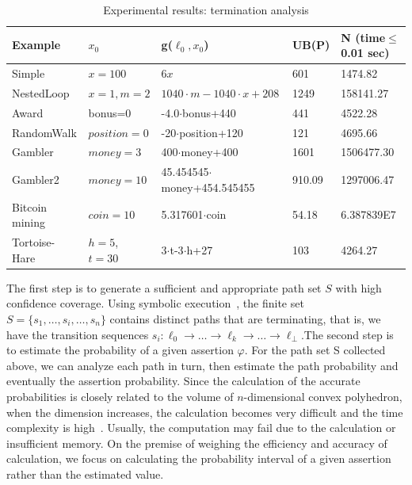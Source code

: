 \documentclass[sigconf,review, anonymous]{acmart}
\begin{document}
\begin{table}[htb]
	\caption{Experimental results: termination analysis}  
	\label{TerminationResult} 
	\begin{center}  
		\begin{tabular}{|l|l|l|l|l|}  
			\hline  	
			Example & $x_0$ & g($\ell_0,x_0$) & UB(P) & N (time$\leq$0.01 sec)\\ \hline  	
			Simple & $x=100$  & $6x$ & 601 & 1474.82 \\ \hline  		
			NestedLoop & $x=1, m=2$ & $1040\cdot m-1040\cdot x+208$ & 1249 & 158141.27 \\  \hline  
			Award & bonus=0 & -4.0$\cdot$bonus+440& 441 &4522.28 \\  \hline  
			RandomWalk & $position=0$ & -20$\cdot$position+120 & 121 & 4695.66 \\  \hline  
			Gambler& $money=3$ & 400$\cdot$money+400& 1601 & 1506477.30 \\ \hline  		 
			Gambler2 & $money=10$ & 45.454545$\cdot$money+454.545455 & 910.09 & 1297006.47 \\  \hline  
			Bitcoin mining & $coin=10$ & 5.317601$\cdot$coin & 54.18 & 6.387839E7 \\  \hline 
			Tortoise-Hare & $h=5$, $t=30$ & 3$\cdot$t-3$\cdot$h+27 & 103 & 4264.27 \\  \hline  
		\end{tabular}  
	\end{center}  
\end{table}

The first step is to generate a sufficient and appropriate path set $S$ with high confidence coverage. Using symbolic execution~\cite{Geldenhuys2012symbolic}, the finite set $S=\{s_1,\dots,s_i,\dots,s_n\}$ contains distinct paths that are terminating, that is, we have the transition sequences $s_i: \ell_0 \to \dots \to \ell_k \to \dots \to \ell_{\bot}$.The second step is to estimate the probability of a given assertion $\varphi$. For the path set S collected above, we can analyze each path in turn, then estimate the path probability and eventually the assertion probability. Since the calculation of the accurate probabilities is closely related to the volume of $n$-dimensional convex polyhedron, when the dimension increases, the calculation becomes very difficult and the time complexity is high~\cite{Arora1998Proof}. Usually, the computation may fail due to the calculation or insufficient memory. On the premise of weighing the efficiency and accuracy of calculation, we focus on calculating the probability interval of a given assertion rather than the estimated value.
\end{document}
